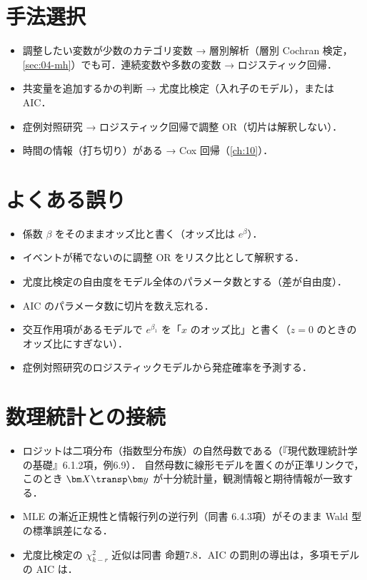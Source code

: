 \section{手法選択}\label{sec:06-choice}
\begin{itemize}
\item 調整したい変数が少数のカテゴリ変数 → 層別解析（層別 Cochran 検定，\cref{sec:04-mh}）でも可．連続変数や多数の変数 → ロジスティック回帰．
\item 共変量を追加するかの判断 → 尤度比検定（入れ子のモデル），または AIC．
\item 症例対照研究 → ロジスティック回帰で調整 OR（切片は解釈しない）．
\item 時間の情報（打ち切り）がある → Cox 回帰（\cref{ch:10}）．
\end{itemize}

\section{よくある誤り}\label{sec:06-err}
\begin{warnbox}
\begin{itemize}
\item 係数 $\beta$ をそのままオッズ比と書く（オッズ比は $e^\beta$）．
\item イベントが稀でないのに調整 OR をリスク比として解釈する．
\item 尤度比検定の自由度をモデル全体のパラメータ数とする（差が自由度）．
\item AIC のパラメータ数に切片を数え忘れる．
\item 交互作用項があるモデルで $e^{\beta_1}$ を「$x$ のオッズ比」と書く（$z=0$ のときのオッズ比にすぎない）．
\item 症例対照研究のロジスティックモデルから発症確率を予測する．
\end{itemize}
\end{warnbox}

\section{数理統計との接続}\label{sec:06-link}
\begin{linkbox}
\begin{itemize}
\item ロジットは二項分布（指数型分布族）の自然母数である（『現代数理統計学の基礎』6.1.2項，例6.9）．
      自然母数に線形モデルを置くのが正準リンクで，このとき $\bm X\transp\bm y$ が十分統計量，観測情報と期待情報が一致する．
\item MLE の漸近正規性と情報行列の逆行列（同書 6.4.3項）がそのまま Wald 型の標準誤差になる．
\item 尤度比検定の $\chi^2_{k-r}$ 近似は同書 命題7.8．AIC の罰則の導出は，多項モデルの AIC は．
\end{itemize}
\end{linkbox}

